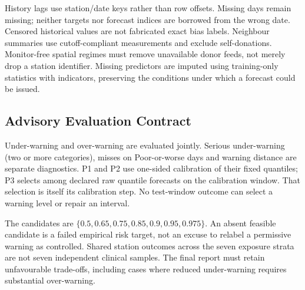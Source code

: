 History lags use station/date keys rather than row offsets. Missing days remain
missing; neither targets nor forecast indices are borrowed from the wrong date.
Censored historical values are not fabricated exact bias labels. Neighbour
summaries use cutoff-compliant measurements and exclude self-donations.
Monitor-free spatial regimes must remove unavailable donor feeds, not merely
drop a station identifier. Missing predictors are imputed using training-only
statistics with indicators, preserving the conditions under which a forecast
could be issued.

\subsection{Advisory Evaluation Contract}
Under-warning and over-warning are evaluated jointly. Serious under-warning
(two or more categories), misses on Poor-or-worse days and warning distance
are separate diagnostics. P1 and P2 use one-sided calibration of their fixed
quantiles; P3 selects among declared raw quantile forecasts on the calibration
window. That selection is itself its calibration step. No test-window outcome
can select a warning level or repair an interval.

The candidates are $\{0.5,0.65,0.75,0.85,0.9,0.95,0.975\}$.
An absent feasible candidate is a failed empirical risk target, not an excuse
to relabel a permissive warning as controlled. Shared station outcomes across
the seven exposure strata are not seven independent clinical samples.
The final report must retain unfavourable trade-offs, including cases where
reduced under-warning requires substantial over-warning.
